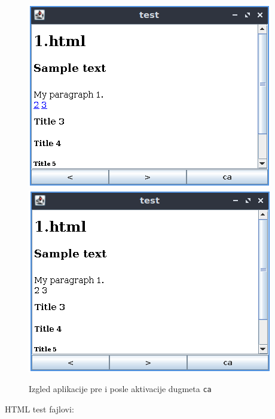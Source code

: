 \documentclass[]{article}
\begin{document}
\begin{figure}[H]
  \centering
  \includegraphics[scale=0.7]{fig1.PNG}
  \includegraphics[scale=0.7]{fig2.PNG}
  \label{fig2}
  \caption{Izgled aplikacije pre i posle aktivacije dugmeta \texttt{ca}}
\end{figure}


HTML test fajlovi:\\
\end{document}
